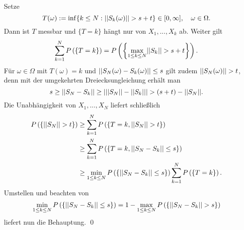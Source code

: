 \begin{proof*}
    Setze 
    $$
        T(\omega) := \inf\{k \leq N: \lvert\lvert S_k(\omega) \rvert\rvert > s + t\} \in [0, \infty], \quad \omega \in \Omega. 
    $$
    Dann ist $T$ messbar und $\{T = k\}$ hängt nur von $X_1,...,X_k$ ab. Weiter gilt 
    $$
        \sum_{k=1}^N P\left(\left\{ T = k \right\}\right) = P\left(\left\{ \max_{1\leq k \leq N}\lvert\lvert S_k \rvert\rvert > s+t \right\}\right).
    $$
    Für $\omega \in \Omega$ mit $T(\omega) = k$ und $\lvert\lvert S_N(\omega) - S_k(\omega) \rvert\rvert \leq s$ gilt zudem $\lvert\lvert S_N(\omega) \rvert\rvert > t$, denn mit der umgekehrten Dreiecksungleichung erhält man
    $$
        s \geq \lvert\lvert S_N - S_k \rvert\rvert \geq \left| \lvert\lvert S_N \rvert\rvert-\lvert\lvert S_k \rvert\rvert \right| > (s+t) - \lvert\lvert S_N \rvert\rvert.
    $$
    Die Unabhängigkeit von $X_1,...,X_N$ liefert schließlich
    \begin{align*}
        P\left(\left\{ \lvert\lvert S_N \rvert\rvert > t \right\}\right) &\geq \sum_{k=1}^N P\left(\left\{ T=k, \lvert\lvert S_N \rvert\rvert > t \right\}\right)  \\\
                              &\geq \sum_{k=1}^N P\left(\left\{ T=k, \lvert\lvert S_N - S_k \rvert\rvert \leq s \right\}\right) \\\
                              &\geq \min_{1\leq k \leq N}P\left(\left\{ \lvert\lvert S_N-S_k \rvert\rvert \leq s \right\}\right) \sum_{k=1}^N P\left(\left\{ T=k \right\}\right). 
    \end{align*}
    Umstellen und beachten von 
    $$
        \min_{1\leq k \leq N}P\left(\left\{ \lvert\lvert S_N-S_k \rvert\rvert \leq s \right\}\right) = 1 - \max_{1\leq k \leq N}P\left(\left\{ \lvert\lvert S_N - S_k \rvert\rvert > s \right\}\right)
    $$
    liefert nun die Behauptung. \qed
\end{proof*}